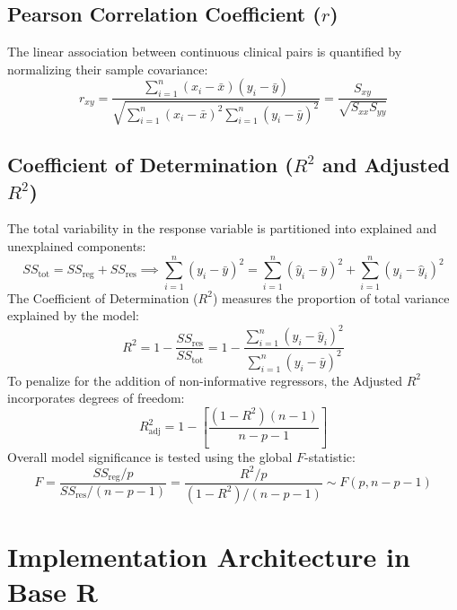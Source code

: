 \documentclass[12pt,a4paper]{article}
\begin{document}
\subsection{Pearson Correlation Coefficient (\texorpdfstring{$r$}{r})}
The linear association between continuous clinical pairs is quantified by normalizing their sample covariance:
\begin{equation}
    r_{xy} = \frac{\sum_{i=1}^n (x_i - \bar{x})(y_i - \bar{y})}{\sqrt{\sum_{i=1}^n (x_i - \bar{x})^2 \sum_{i=1}^n (y_i - \bar{y})^2}} = \frac{S_{xy}}{\sqrt{S_{xx} S_{yy}}}
\end{equation}

\subsection{Coefficient of Determination (\texorpdfstring{$R^2$}{R2} and Adjusted \texorpdfstring{$R^2$}{R2})}
The total variability in the response variable is partitioned into explained and unexplained components:
\begin{equation}
    SS_{\text{tot}} = SS_{\text{reg}} + SS_{\text{res}} \implies \sum_{i=1}^n (y_i - \bar{y})^2 = \sum_{i=1}^n (\hat{y}_i - \bar{y})^2 + \sum_{i=1}^n (y_i - \hat{y}_i)^2
\end{equation}
The Coefficient of Determination ($R^2$) measures the proportion of total variance explained by the model:
\begin{equation}
    R^2 = 1 - \frac{SS_{\text{res}}}{SS_{\text{tot}}} = 1 - \frac{\sum_{i=1}^n (y_i - \hat{y}_i)^2}{\sum_{i=1}^n (y_i - \bar{y})^2}
\end{equation}
To penalize for the addition of non-informative regressors, the Adjusted $R^2$ incorporates degrees of freedom:
\begin{equation}
    R^2_{\text{adj}} = 1 - \left[ \frac{(1 - R^2)(n - 1)}{n - p - 1} \right]
\end{equation}
Overall model significance is tested using the global $F$-statistic:
\begin{equation}
    F = \frac{SS_{\text{reg}} / p}{SS_{\text{res}} / (n - p - 1)} = \frac{R^2 / p}{(1 - R^2) / (n - p - 1)} \sim F(p, n - p - 1)
\end{equation}

\section{Implementation Architecture in Base R}
\end{document}
